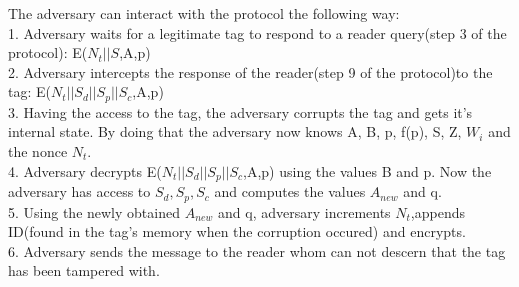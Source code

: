     The adversary can interact with the protocol the following way: \\
    \hspace*{1cm} 
    1. Adversary waits for a legitimate tag to respond to a reader query(step 3 of the protocol): E($N_t||S$,A,p)\\
    \hspace*{1cm}
    2. Adversary intercepts the response of the reader(step 9 of the protocol)to the tag: E($N_t||S_d||S_p||S_c$,A,p)\\
    \hspace*{1cm}
    3. Having the access to the tag, the adversary corrupts the tag and gets it's internal state. By doing that the adversary now knows A, B, p, f(p), S, Z, $W_i$ and the nonce $N_t$.\\
    \hspace*{1cm}
    4. Adversary decrypts E($N_t||S_d||S_p||S_c$,A,p) using the values B and p. Now the adversary has access to $S_d, S_p, S_c$ and computes the values $A_{new}$ and q.\\
    \hspace*{1cm}
    5. Using the newly obtained $A_{new}$ and q, adversary increments $N_t$,appends ID(found in the tag's memory when the corruption occured) and encrypts. \\
    \hspace*{1cm}
    6. Adversary sends the message to the reader whom can not descern that the tag has been tampered with. \\

